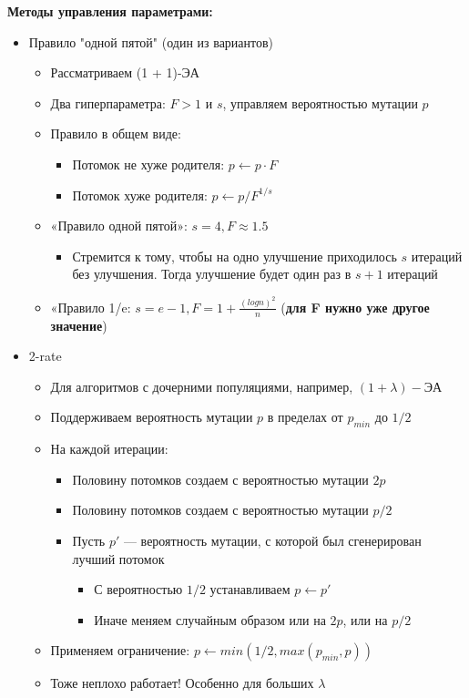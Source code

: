 \textbf{Методы управления параметрами:}
\begin{itemize}
    \item Правило "одной пятой" (один из вариантов)
    \begin{itemize}
        \item Рассматриваем (1 + 1)-ЭА
        \item Два гиперпараметра: $F > 1$ и $s$, управляем вероятностью мутации $p$
        \item Правило в общем виде:
        \begin{itemize}
            \item Потомок не хуже родителя: $p \leftarrow p · F$ 
            \item Потомок хуже родителя: $p \leftarrow p/F^{1/s}$
        \end{itemize}
        \item «Правило одной пятой»: $s= 4, F \approx 1.5$
        \begin{itemize}
            \item Стремится к тому, чтобы на одно улучшение приходилось $s$ итераций без улучшения. Тогда улучшение будет один раз в $s + 1$ итераций
        \end{itemize}
        \item «Правило 1/e: $s= e-1, F = 1 + \frac{(logn)^2}{n}$ (\textbf{для F нужно уже другое значение})
    \end{itemize}
    \item 2-rate
    \begin{itemize}
        \item Для алгоритмов с дочерними популяциями, например, $(1 + \lambda)-ЭА$
        \item Поддерживаем вероятность мутации $p$ в пределах от $p_{min}$ до $1/2$
        \item На каждой итерации:
        \begin{itemize}
            \item Половину потомков создаем с вероятностью мутации $2p$
            \item Половину потомков создаем с вероятностью мутации $p/2$
            \item Пусть $p′$ — вероятность мутации, с которой был сгенерирован лучший потомок
            \begin{itemize}
                \item С вероятностью $1/2$ устанавливаем $p \leftarrow p′$
                \item Иначе меняем случайным образом или на $2p$, или на $p/2$
            \end{itemize}
        \end{itemize}
        \item Применяем ограничение: $p \leftarrow min(1/2, max(p_{min}, p ))$
        \item Тоже неплохо работает! Особенно для больших $\lambda$    
    \end{itemize}
\end{itemize}



